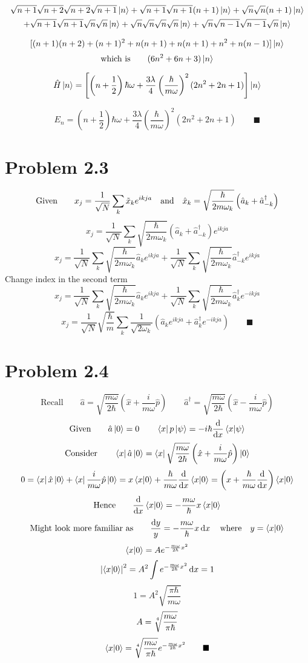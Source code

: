 \documentclass{amsart}
\begin{document}
\begin{multline*}
\sqrt{n+1}\sqrt{n+2}\sqrt{n+2}\sqrt{n+1}\ket{n}+\sqrt{n+1}\sqrt{n+1}(n+1)\ket{n}+\sqrt{n}\sqrt{n}(n+1)\ket{n}\\+\sqrt{n+1}\sqrt{n+1}\sqrt{n}\sqrt{n}\ket{n}+\sqrt{n}\sqrt{n}\sqrt{n}\sqrt{n}\ket{n}+\sqrt{n}\sqrt{n-1}\sqrt{n-1}\sqrt{n}\ket{n}
\end{multline*}

\[[(n+1)(n+2)+(n+1)^2+n(n+1)+n(n+1)+n^2+n(n-1)]\ket{n}\]
\[\text{which is}\qquad(6n^2+6n+3)\ket{n}\]

\[\hat{H}\ket{n}=\left[\left(n+\frac{1}{2}\right)\hbar\omega+\frac{3\lambda}{4}\left(\frac{\hbar}{m\omega}\right)^2(2n^2+2n+1)\right]\ket{n}\]

\[E_n=\left(n+\frac{1}{2}\right)\hbar\omega+\frac{3\lambda}{4}\left(\frac{\hbar}{m\omega}\right)^2(2n^2+2n+1)\qquad\blacksquare\]

\section*{Problem 2.3}
\[\text{Given}\qquad x_j=\frac{1}{\sqrt{N}}\sum_k \tilde{x}_k e^{ikja}\qq{and} \hat{x}_k=\sqrt{\frac{\hbar}{2m\omega_k}}\left(\hat{a}_k+\hat{a}^\dagger_{-k}\right)\]
\[x_j=\frac{1}{\sqrt{N}}\sum_k \sqrt{\frac{\hbar}{2m\omega_k}}\left(\hat{a}_k+\hat{a}^\dagger_{-k}\right) e^{ikja}\]
\[x_j=\frac{1}{\sqrt{N}}\sum_k \sqrt{\frac{\hbar}{2m\omega_k}}\hat{a}_k e^{ikja}+\frac{1}{\sqrt{N}}\sum_k \sqrt{\frac{\hbar}{2m\omega_k}}\hat{a}^\dagger_{-k} e^{ikja}\]
Change index in the second term
\[x_j=\frac{1}{\sqrt{N}}\sum_k \sqrt{\frac{\hbar}{2m\omega_k}}\hat{a}_k e^{ikja}+\frac{1}{\sqrt{N}}\sum_k \sqrt{\frac{\hbar}{2m\omega_{k}}}\hat{a}^\dagger_{k} e^{-ikja}\]
\[x_j=\frac{1}{\sqrt{N}}\sqrt{\frac{\hbar}{m}}\sum_k \frac{1}{\sqrt{2\omega_k}}\left(\hat{a}_k e^{ikja}+\hat{a}^\dagger_{k} e^{-ikja}\right)\qquad\blacksquare\]


\section*{Problem 2.4}
\[\text{Recall}\qquad\hat{a}  = \sqrt{\frac{m\omega}{2\hbar}}\left(\hat{x} + \frac{i}{m\omega}\hat{p}\right) \qquad\hat{a}^\dagger  = \sqrt{\frac{m\omega}{2\hbar}}\left(\hat{x} - \frac{i}{m\omega}\hat{p}\right)\]
\[\text{Given}\qquad\hat{a}\ket{0}=0\qquad\bra{x}p\ket{\psi} = -i\hbar \dv{x}\bra{x}\ket{\psi}\]
\[\text{Consider}\qquad\bra{x}\hat{a}\ket{0}= \bra{x}\sqrt{\frac{m\omega}{2\hbar}}\left(\hat{x} + \frac{i}{m\omega}\hat{p}\right)\ket{0}\]
\[0= \bra{x}\hat{x}\ket{0} + \bra{x}\frac{i}{m\omega}\hat{p}\ket{0}=x\bra{x}\ket{0}+\frac{\hbar}{m\omega}\dv{x}\bra{x}\ket{0}=\left(x+\frac{\hbar}{m\omega}\dv{x}\right)\bra{x}\ket{0}\]
\[\text{Hence}\qquad\dv{x}\bra{x}\ket{0}=-\frac{m\omega}{\hbar}x\bra{x}\ket{0}\]
\[\text{Might look more familiar as}\qquad\frac{\dd{y}}{y}=-\frac{m\omega}{\hbar}x\dd{x}\qq{where}y=\bra{x}\ket{0}\]
\[\bra{x}\ket{0}=Ae^{-\frac{m\omega}{2\hbar}x^2}\]
\[\abs{\bra{x}\ket{0}}^2=A^2\int e^{-\frac{m\omega}{2\hbar}x^2}\dd{x}=1\]
\[1=A^2\sqrt{\frac{\pi\hbar}{m\omega}}\]
\[A=\sqrt[\uproot{2}4]{\frac{m\omega}{\pi\hbar}}\]
\[\bra{x}\ket{0}=\sqrt[\uproot{2}4]{\frac{m\omega}{\pi\hbar}}e^{-\frac{m\omega}{2\hbar}x^2}\qquad\blacksquare\]
\end{document}
